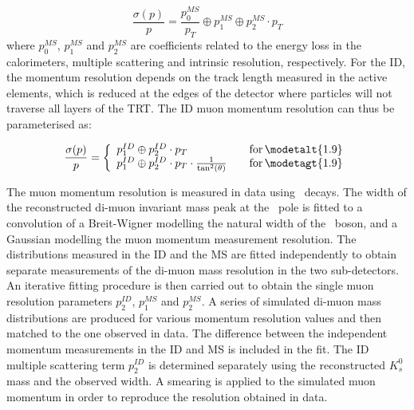 \begin{equation}
\frac{ \sigma (p) }{ p } = \frac{ p_{0}^{MS} }{ p_{T} } \oplus  p_{1}^{MS}
\oplus  p_{2}^{MS} \cdot p_{T}
\end{equation}
where $p_{0}^{MS}$, $p_{1}^{MS}$ and $p_{2}^{MS}$ are coefficients related to
the energy loss in the calorimeters, multiple scattering and intrinsic
resolution, respectively. For the ID, the momentum resolution depends on the
track length measured in the active elements, which is reduced at the edges of
the detector where particles will not traverse all layers of the TRT. The ID
muon momentum resolution can thus be parameterised as:

\begin{equation}
\frac{ \sigma (p) }{ p } = \left\{
    \begin{array}{l l}
        p_{1}^{ID} \oplus  p_{2}^{ID} \cdot p_{T}  & \quad {\rm
for}\, \modetalt{1.9} \\
    p_{1}^{ID} \oplus  p_{2}^{ID} \cdot p_{T} \cdot
\frac{1}{\tan ^{2} (\theta)}  & \quad {\rm for}\, \modetagt{1.9} \\
  \end{array} \right.
\end{equation}

The muon momentum resolution is measured in data using \Zmm\ decays. The width
of the reconstructed di-muon invariant mass peak at the \Z\ pole is fitted to a
convolution of a Breit-Wigner modelling the natural width of the \Z\ boson, and
a Gaussian modelling the muon momentum measurement resolution. The distributions
measured in the ID and the MS are fitted independently to obtain separate
measurements of the di-muon mass resolution in the two sub-detectors. An
iterative fitting procedure is then carried out to obtain the single muon
resolution parameters $p_{2}^{ID}$, $p_{1}^{MS}$ and $p_{2}^{MS}$. A series of simulated di-muon mass distributions are
produced for various momentum resolution values and then matched to the one
observed in data. The difference between the independent momentum measurements
in the ID and MS is included in the fit.  The ID multiple scattering term $p_{2}^{ID}$ is determined
separately using the reconstructed $K_{s}^{0}$ mass and the observed \JPsi
width. A smearing is applied to the simulated muon momentum in order
to reproduce the resolution obtained in data. 

%
%
%



